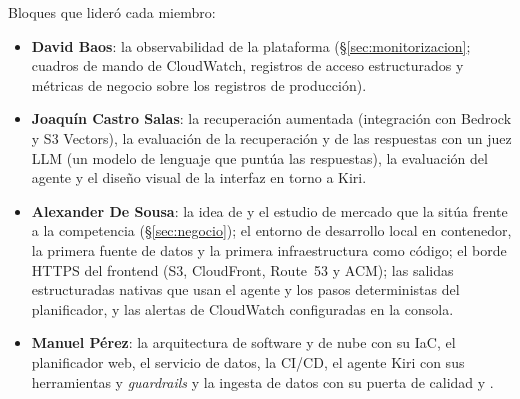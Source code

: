 Bloques que lideró cada miembro:
\begin{itemize}
  \item \textbf{David Baos}: la observabilidad de la plataforma (§\ref{sec:monitorizacion}; cuadros de mando de
        CloudWatch, registros de acceso estructurados y métricas de negocio sobre los registros de
        producción).

  \item \textbf{Joaquín Castro Salas}: la recuperación aumentada (integración con Bedrock y
        S3 Vectors), la evaluación de la recuperación y de las respuestas con un juez LLM (un
        modelo de lenguaje que puntúa las respuestas), la evaluación del agente y el diseño visual
        de la interfaz en torno a Kiri.
  \item \textbf{Alexander De Sousa}: la idea de \kyrian{} y el estudio de mercado que la sitúa
        frente a la competencia (§\ref{sec:negocio}); el entorno de desarrollo local en
        contenedor, la primera fuente de datos y la primera infraestructura como código; el borde
        HTTPS del frontend (S3, CloudFront, Route~53 y ACM); las salidas estructuradas nativas que
        usan el agente y los pasos deterministas del planificador, y las alertas de CloudWatch
        configuradas en la consola.
  \item \textbf{Manuel Pérez}: la arquitectura de software y de nube con su IaC, el
        planificador web, el servicio de datos, la CI/CD, el agente Kiri con sus herramientas y
        \emph{guardrails} y la ingesta de datos con su puerta de calidad y .
\end{itemize}
